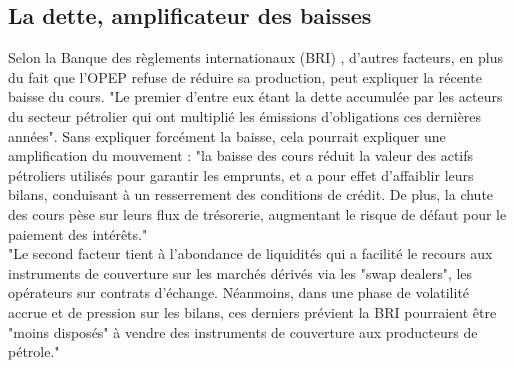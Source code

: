 \subsection{La dette, amplificateur des baisses}
Selon la Banque des règlements internationaux (BRI) \cite{echosDette}, d’autres facteurs, en plus du fait que l’OPEP refuse de réduire sa production, peut expliquer la récente baisse du cours. "Le premier d’entre eux étant la dette accumulée par les acteurs du secteur pétrolier qui ont multiplié les émissions d’obligations ces dernières années". Sans expliquer forcément la baisse, cela pourrait expliquer une amplification du mouvement : "la baisse des cours réduit la valeur des actifs pétroliers utilisés pour garantir les emprunts, et a pour effet d’affaiblir leurs bilans, conduisant à un resserrement des conditions de crédit. De plus, la chute des cours pèse sur leurs flux de trésorerie, augmentant le risque de défaut pour le paiement des intérêts."\\
"Le second facteur tient à l’abondance de liquidités qui a facilité le recours aux instruments de couverture sur les marchés dérivés via les "swap dealers", les opérateurs sur contrats d’échange. Néanmoins, dans une phase de volatilité accrue et de pression sur les bilans, ces derniers prévient la BRI pourraient être "moins disposés" à vendre des instruments de couverture aux producteurs de pétrole."
